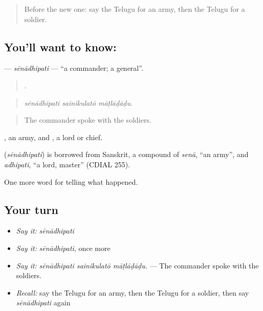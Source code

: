 \label{lesson:TE-C339-senadhipati}



\begin{quote}
Before the new one: say the Telugu for an army, then the Telugu for a soldier.
\end{quote}

\subsection*{You'll want to know: }
\textbf{} — \emph{sēnādhipati} — \textquotedblleft{}a commander; a general\textquotedblright{}.

\begin{quote}
  .
\end{quote}

\begin{quote}
\emph{sēnādhipati sainikulatō māṭlāḍāḍu.}
\end{quote}

\begin{quote}
The commander spoke with the soldiers.
\end{quote}

, an army, and , a lord or chief.

\begin{cousinweb}
\textbf{} (\emph{sēnādhipati}) is borrowed from Sanskrit, a compound of \emph{senā}, \textquotedblleft{}an army\textquotedblright{}, and \emph{adhipati}, \textquotedblleft{}a lord, master\textquotedblright{} (CDIAL 255).
\end{cousinweb}

\begin{grammarlens}[title={What you've built}]
One more word for telling what happened.
\end{grammarlens}

\subsection*{Your turn}
\begin{itemize}
\raggedright
  \item \emph{Say it:} \emph{sēnādhipati}
  \item \emph{Say it:} \emph{sēnādhipati}, once more
  \item \emph{Say it:} \emph{sēnādhipati sainikulatō māṭlāḍāḍu.} — The commander spoke with the soldiers.
  \item \emph{Recall:} say the Telugu for an army, then the Telugu for a soldier, then say \emph{sēnādhipati} again
\end{itemize}

